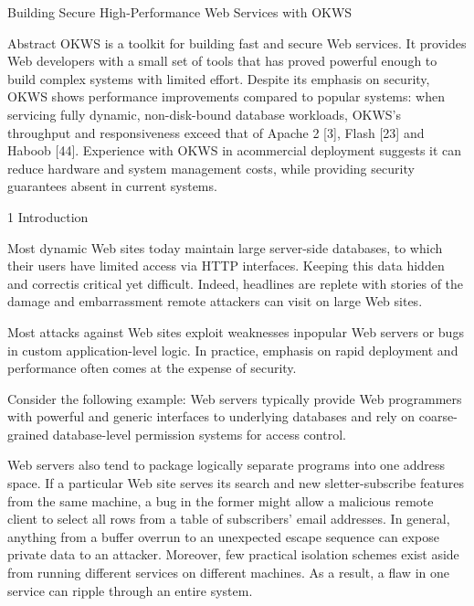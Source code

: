 Building Secure High-Performance Web Services with OKWS

Abstract
OKWS is a toolkit for building fast and secure Web services. 
It provides Web developers with a small set of tools that has proved powerful
enough to build complex systems with limited effort. 
Despite its emphasis on security, OKWS shows performance improvements compared
to popular systems: when servicing fully dynamic, non-disk-bound database
workloads, OKWS's throughput and responsiveness exceed that of Apache 2 [3],
Flash [23] and Haboob [44]. 
Experience with OKWS in acommercial deployment suggests it can reduce hardware
and system management costs, while providing security guarantees absent in
current systems.

1 Introduction

Most dynamic Web sites today maintain large server-side databases, to which
their users have limited access via HTTP interfaces.
Keeping this data hidden and correctis critical yet difficult. 
Indeed, headlines are replete with stories of the damage and embarrassment
remote attackers can visit on large Web sites.
%

Most attacks against Web sites exploit weaknesses inpopular Web servers or bugs
in custom application-level logic. 
In practice, emphasis on rapid deployment and performance often comes at the
expense of security.

Consider the following example: Web servers typically provide Web programmers
with powerful and generic interfaces to underlying databases and rely on
coarse-grained database-level permission systems for access control. 

Web servers also tend to package logically separate programs into one address
space.
If a particular Web site serves its search and new sletter-subscribe features
from the same machine, a bug in the former might allow a malicious remote
client to select all rows from a table of subscribers' email addresses. 
In general, anything from a buffer overrun to an unexpected escape sequence can
expose private data to an attacker. 
Moreover, few practical isolation schemes exist aside from running different
services on different machines. 
As a result, a flaw in one service can ripple through an entire system.

